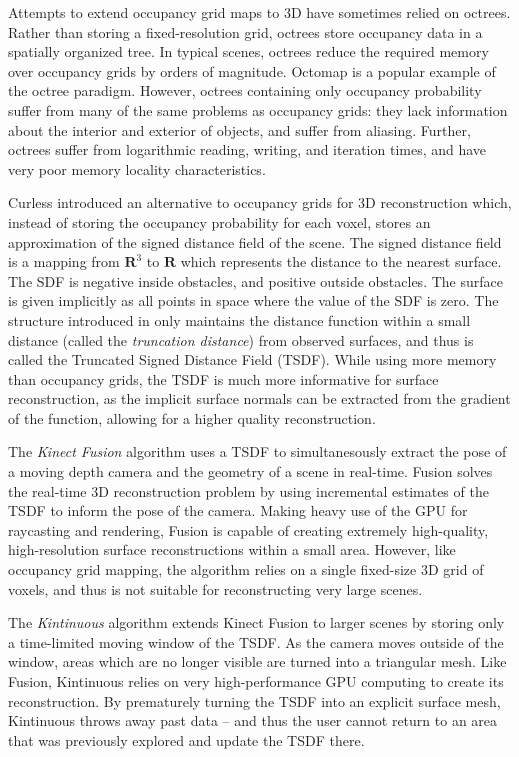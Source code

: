 \documentclass[10pt,twocolumn,letterpaper]{article}
\begin{document}
Attempts to extend occupancy grid maps to 3D have sometimes relied on octrees.
Rather than storing a fixed-resolution grid, octrees store occupancy data in a
spatially organized tree. In typical scenes, octrees reduce the required memory
over occupancy grids by orders of magnitude. Octomap \cite{Wurm2010} is a
popular example of the octree paradigm. However, octrees containing only
occupancy probability suffer from many of the same problems as occupancy grids:
they lack information about the interior and exterior of objects, and suffer
from aliasing. Further, octrees suffer from logarithmic reading, writing, and
iteration times, and have very poor memory locality characteristics.

Curless \cite{Curless1996} introduced an alternative to occupancy grids for 3D
reconstruction which, instead of storing the occupancy probability for each
voxel, stores an approximation of the signed distance field of the scene. The signed distance
field is a mapping from $\mathbf{R}^3$ to $\mathbf{R}$ which represents the
distance to the nearest surface. The SDF is negative inside obstacles, and
positive outside obstacles. The surface is given implicitly as all points in
space where the value of the SDF is zero. The structure introduced in
\cite{Curless1996} only maintains the distance function within a small distance 
(called the \emph{truncation distance}) from observed surfaces, and thus is called the
Truncated Signed Distance Field (TSDF).  While using more memory than occupancy
grids, the TSDF is much more informative for surface reconstruction, as the
implicit surface normals can be extracted from the gradient of the function,
allowing for a higher quality reconstruction.

The \emph{Kinect Fusion} \cite{Newcombe} algorithm uses a TSDF to
simultanesously extract the pose of a moving depth camera and the geometry of a
scene in real-time. Fusion solves the real-time 3D reconstruction problem
by using incremental estimates of the TSDF to inform the pose of the camera.
Making heavy use of the GPU for raycasting and rendering, Fusion is
capable of creating extremely high-quality, high-resolution surface 
reconstructions within a small area. However, like occupancy grid mapping, the
algorithm relies on a single fixed-size 3D grid of voxels, and thus is not
suitable for reconstructing very large scenes.

The \emph{Kintinuous} \cite{Whelan2013} algorithm extends Kinect Fusion to
larger scenes by storing only a time-limited moving window of the TSDF. As the camera
moves outside of the window, areas which are no longer visible are turned into a
triangular mesh. Like Fusion, Kintinuous relies on very high-performance GPU
computing to create its reconstruction.  By prematurely turning the TSDF into an
explicit surface mesh, Kintinuous throws away past data -- and thus the user
cannot return to an area that was previously explored and update the TSDF there.
\end{document}
